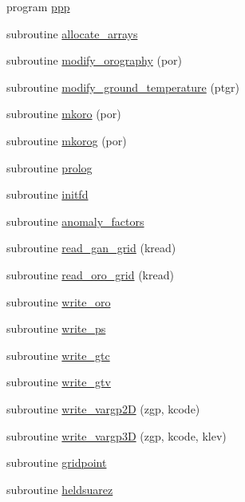 \begin{DoxyCompactItemize}
\item 
program \hyperlink{ppp_8f90_a4d3d5ecbb97268b3c90454dee07327fe}{ppp}
\item 
subroutine \hyperlink{ppp_8f90_a486bae2289e6e28e652b41555030d3e6}{allocate\-\_\-arrays}
\item 
subroutine \hyperlink{ppp_8f90_a4b65f4d96e40adbdb96584789e31c413}{modify\-\_\-orography} (por)
\item 
subroutine \hyperlink{ppp_8f90_a7c8f4c3a7e4437cad6804ae0ce847552}{modify\-\_\-ground\-\_\-temperature} (ptgr)
\item 
subroutine \hyperlink{ppp_8f90_af163501e7aad4a154d2317e8adbf8414}{mkoro} (por)
\item 
subroutine \hyperlink{ppp_8f90_af9ce54d8de253b6c88bc6b01b3a247a5}{mkorog} (por)
\item 
subroutine \hyperlink{ppp_8f90_afde378004f20ed8741a7e9bcd82cbfe4}{prolog}
\item 
subroutine \hyperlink{ppp_8f90_a51f5938296dd343ce807dbb6d1a16e49}{initfd}
\item 
subroutine \hyperlink{ppp_8f90_a7f841b10d9e4f470513770f91f92c0bc}{anomaly\-\_\-factors}
\item 
subroutine \hyperlink{ppp_8f90_ab9365bc6b428500db06eb0a96278de88}{read\-\_\-gan\-\_\-grid} (kread)
\item 
subroutine \hyperlink{ppp_8f90_a0160f7188865bdf68c170ebafa9e63ba}{read\-\_\-oro\-\_\-grid} (kread)
\item 
subroutine \hyperlink{ppp_8f90_a874acd25b1eb736cf7273817e3dcbdf8}{write\-\_\-oro}
\item 
subroutine \hyperlink{ppp_8f90_a9ffa8d77da63780dde165c7f4651592a}{write\-\_\-ps}
\item 
subroutine \hyperlink{ppp_8f90_ae20643bdbfabfc228f286eec7a42e944}{write\-\_\-gtc}
\item 
subroutine \hyperlink{ppp_8f90_a89cf301d11495b03846a06a6b3cb095f}{write\-\_\-gtv}
\item 
subroutine \hyperlink{ppp_8f90_a2d0d1495a01c220ffb26fc235bcbfc8d}{write\-\_\-vargp2\-D} (zgp, kcode)
\item 
subroutine \hyperlink{ppp_8f90_a5a952435a8bde10e925935c211aa9c4f}{write\-\_\-vargp3\-D} (zgp, kcode, klev)
\item 
subroutine \hyperlink{ppp_8f90_aefdbfd36b330ce29d344d428431119c9}{gridpoint}
\item 
subroutine \hyperlink{ppp_8f90_a6e5d7b2cf5629dbed1ee32fc656595dc}{heldsuarez}

\end{DoxyCompactItemize}
